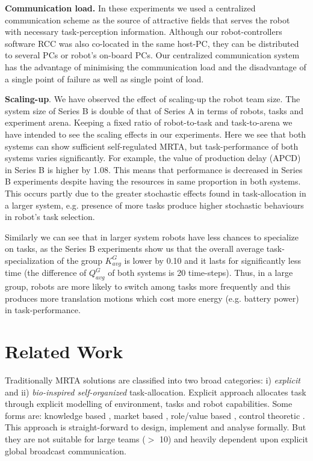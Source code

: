 \documentclass[smallcondensed]{svjour3}
\begin{document}
\textbf{Communication load.} In these experiments we used a centralized communication scheme as the source of attractive fields that serves the robot with necessary task-perception information. Although our robot-controllers software RCC was also co-located in the same host-PC, they can be distributed to several PCs or robot's on-board PCs. Our centralized communication system has the advantage of minimising the communication load and the disadvantage of a single point of failure as well as single point of load. 

\textbf{Scaling-up}. We have observed the effect of scaling-up the robot team size. The system size of Series B is double of that of Series A in terms of robots, tasks and experiment arena. Keeping a fixed ratio of robot-to-task and task-to-arena we have intended to see the scaling effects in our experiments. Here we see that both systems can show sufficient self-regulated MRTA, but task-performance of both systems varies significantly. For example, the value of production delay (APCD) in Series B is higher by 1.08. This means that performance  is decreased in Series B experiments despite having the resources in same proportion in both systems. This occurs partly due to the greater stochastic effects found in task-allocation in a larger system, e.g. presence of more tasks produce higher stochastic behaviours in robot's task selection.

Similarly we can see that in larger system robots have less chances to specialize on tasks, as the Series B experiments show us that the overall average task-specialization of the group $K^G_{avg}$ is lower by 0.10 and it lasts for significantly less time (the difference of $Q^G_{avg}$  of both systems is 20 time-steps). Thus, in a large group, robots are more likely to switch among tasks more frequently and this produces more translation motions which cost more energy (e.g. battery power) in task-performance.
\section{Related Work}
\label{sec:rw}
Traditionally MRTA solutions are classified into two broad categories: i) {\em explicit} and ii) {\em bio-inspired self-organized} task-allocation.  Explicit approach allocates task through explicit modelling of environment, tasks and robot capabilities. Some forms are: knowledge based \citep{Parker1998}, market based \citep{Dias+2006}, role/value based \citep{Chaimowicz2002}, control theoretic \citep{Belta+2004}. This approach is straight-forward to design, implement and analyse formally. But they are not suitable for large teams ($>$ 10)  and heavily dependent upon explicit global broadcast communication.  
\end{document}

